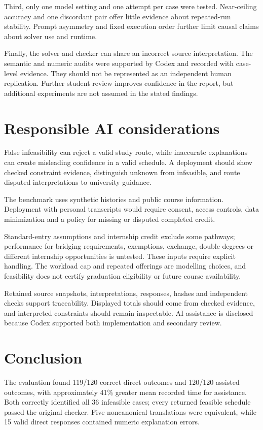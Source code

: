 \documentclass[11pt,a4paper]{article}
\begin{document}
Third, only one model setting and one attempt per case were tested.
Near-ceiling accuracy and one discordant pair offer little evidence about
repeated-run stability. Prompt asymmetry and fixed execution order further
limit causal claims about solver use and runtime.

Finally, the solver and checker can share an incorrect source interpretation.
The semantic and numeric audits were supported by Codex and recorded with
case-level evidence. They should not be represented as an independent
human replication. Further student review improves confidence in the report,
but additional experiments are not assumed in the stated findings.

\par
\section{Responsible AI considerations}
False infeasibility can reject a valid study route, while inaccurate
explanations can create misleading confidence in a valid schedule.
A deployment should show checked constraint evidence, distinguish unknown
from infeasible, and route disputed interpretations to university guidance.

The benchmark uses synthetic histories and public course information.
Deployment with personal transcripts would require consent, access controls,
data minimization and a policy for missing or disputed completed credit.

Standard-entry assumptions and internship credit exclude some pathways;
performance for bridging requirements, exemptions, exchange, double degrees
or different internship opportunities is untested. These inputs require
explicit handling. The workload cap and repeated offerings are modelling
choices, and feasibility does not certify graduation eligibility or future
course availability.

Retained source snapshots, interpretations, responses, hashes and independent
checks support traceability. Displayed totals should come from checked
evidence, and interpreted constraints should remain inspectable. AI assistance
is disclosed because Codex supported both implementation and secondary review.

\section{Conclusion}
The evaluation found 119/120 correct direct outcomes and 120/120 assisted
outcomes, with approximately 41\% greater mean recorded time for assistance.
Both correctly identified all 36 infeasible cases; every returned feasible
schedule passed the original checker. Five noncanonical translations were
equivalent, while 15 valid direct responses contained numeric explanation errors.
\end{document}
